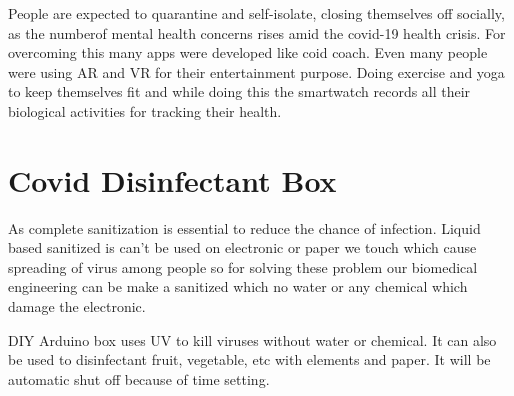 \documentclass[12pt]{article}
\begin{document}
People are expected to quarantine and self-isolate, closing themselves off socially, as the numberof mental health concerns rises amid the covid-19 health crisis. For overcoming this many apps were developed like coid coach. Even many people were using AR and VR for their entertainment purpose. Doing exercise and yoga to keep themselves fit and while  doing this the smartwatch records all their biological activities for tracking their health.

\section{Covid Disinfectant Box}
 
As complete sanitization is essential to reduce the chance of infection. Liquid based sanitized is can't be used on electronic or paper we touch which cause spreading of virus among people so for solving these problem our biomedical engineering can be make a sanitized which no water or any chemical which damage the electronic.

DIY Arduino box uses UV to kill viruses without water or chemical. It can also be used to disinfectant fruit, vegetable, etc with elements and paper. It will be automatic shut off because of time setting.    
\end{document}
